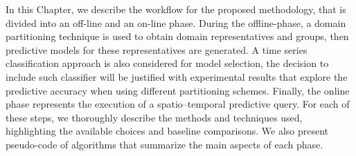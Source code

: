 In this Chapter, we describe the workflow for the proposed methodology, that is divided into an off-line and an on-line phase. During the offline-phase, a domain partitioning technique is used to obtain domain representatives and groups, then predictive models for these representatives are generated. A time series classification approach is also considered for model selection, the decision to include such classifier will be justified with experimental results that explore the predictive accuracy when using different partitioning schemes. Finally, the online phase represents the execution of a spatio--temporal predictive query. For each of these steps, we thoroughly describe the methods and techniques used, highlighting the available choices and baseline comparisons. We also present pseudo-code of algorithms that summarize the main aspects of each phase.